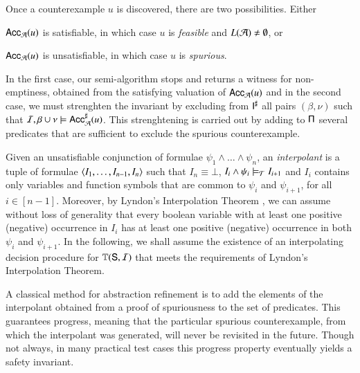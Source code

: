 \documentclass[10pt]{llncs}
\begin{document}
Once a counterexample $u$ is discovered, there are two
possibilities. Either\begin{inparaenum}[(i)]
\item $\mathsf{Acc}_{\mathcal{A}}(u)$ is satisfiable, in which case $u$ is
  \emph{feasible} and $L(\mathcal{A}) \neq \emptyset$, or
%
\item $\mathsf{Acc}_{\mathcal{A}}(u)$ is unsatisfiable, in which case $u$ is
  \emph{spurious}.
\end{inparaenum}
In the first case, our semi-algorithm stops and returns a witness for
non-emptiness, obtained from the satisfying valuation of
$\mathsf{Acc}_{\mathcal{A}}(u)$ and in the second case, we must strenghten the
invariant by excluding from ${\mathsf{I}}^\sharp$ all pairs $(\beta,\nu)$ such
that $\mathcal{I},\beta\cup\nu \models {\mathsf{Acc}}^\sharp_{\mathcal{A}}(u)$. This strenghtening
is carried out by adding to $\mathsf{\Pi}$ several predicates that are
sufficient to exclude the spurious counterexample.

Given an unsatisfiable conjunction of formulae $\psi_1 \wedge \ldots
\wedge \psi_n$, an \emph{interpolant} is a tuple of formulae
$\left\langle I_1,\ldots,I_{n-1},I_n \right\rangle$ such that $I_n \equiv \bot$, $I_i
\wedge \psi_i \models_{\mathcal{T}} I_{i+1}$ and $I_i$ contains only variables
and function symbols that are common to $\psi_i$ and $\psi_{i+1}$, for
all $i \in [n-1]$. Moreover, by Lyndon's Interpolation Theorem
\cite{Lyndon59}, we can assume without loss of generality that every
boolean variable with at least one positive (negative) occurrence in
$I_i$ has at least one positive (negative) occurrence in both $\psi_i$
and $\psi_{i+1}$. In the following, we shall assume the existence of
an interpolating decision procedure for $\mathbb{T}(\mathsf{S},\mathcal{I})$ that meets
the requirements of Lyndon's Interpolation Theorem.


A classical method for abstraction refinement is to add the elements
of the interpolant obtained from a proof of spuriousness to the set of
predicates. This guarantees progress, meaning that the particular
spurious counterexample, from which the interpolant was generated,
will never be revisited in the future. Though not always, in many
practical test cases this progress property eventually yields a safety
invariant.
\end{document}
